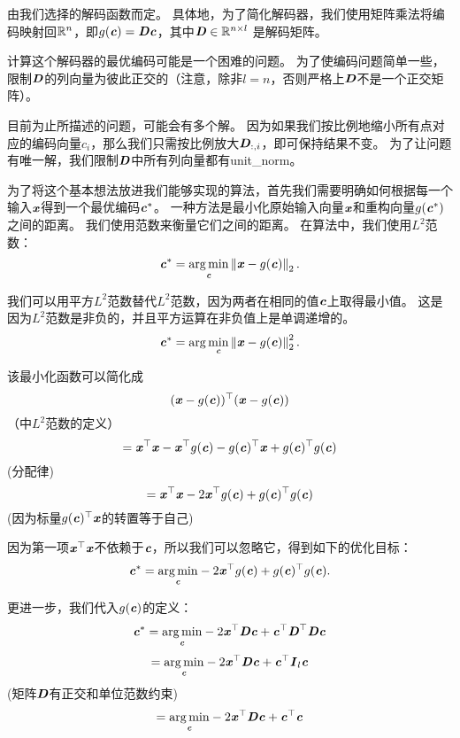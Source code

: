由我们选择的解码函数而定。
具体地，为了简化解码器，我们使用矩阵乘法将编码映射回$\SetR^n$，即$g(\Vc)=\MD\Vc$，其中$\MD\in \SetR^{n\times l}$ 是解码矩阵。



计算这个解码器的最优编码可能是一个困难的问题。
为了使编码问题简单一些，限制$\MD$的列向量为彼此正交的（注意，除非$l=n$，否则严格上$\MD$不是一个正交矩阵）。


目前为止所描述的问题，可能会有多个解。
因为如果我们按比例地缩小所有点对应的编码向量$c_i$，那么我们只需按比例放大$\MD_{:,i}$，即可保持结果不变。
为了让问题有唯一解，我们限制$\MD$中所有列向量都有\gls{unit_norm}。


为了将这个基本想法放进我们能够实现的算法，首先我们需要明确如何根据每一个输入$\Vx$得到一个最优编码$\Vc^*$。
一种方法是最小化原始输入向量$\Vx$和重构向量$g(\Vc^*)$之间的距离。
我们使用范数来衡量它们之间的距离。
在算法中，我们使用$L^2$范数：
\begin{equation}
\label{eq:2.52}
\Vc^* = \underset{\Vc}{\arg\min} \norm{\Vx-g(\Vc)}_2.
\end{equation}


我们可以用平方$L^2$范数替代$L^2$范数，因为两者在相同的值$\Vc$上取得最小值。
这是因为$L^2$范数是非负的，并且平方运算在非负值上是单调递增的。
\begin{equation}
\Vc^* = \argmin_{\Vc} \norm{\Vx - g(\Vc)}_2^2.
\end{equation}


该最小化函数可以简化成
\begin{equation}
(\Vx-g(\Vc))^\top(\Vx-g(\Vc))
\end{equation}
（中$L^2$范数的定义）
\begin{equation}
    = \Vx^\top\Vx - \Vx^\top g(\Vc) - g(\Vc)^\top\Vx + g(\Vc)^\top g(\Vc)
\end{equation}
(分配律)
\begin{equation}
    = \Vx^\top \Vx - 2\Vx^\top g(\Vc) + g(\Vc)^\top g(\Vc)
\end{equation}
(因为标量$g(\Vc)^\top\Vx$的转置等于自己)


因为第一项$\Vx^\top\Vx$不依赖于$\Vc$，所以我们可以忽略它，得到如下的优化目标：
\begin{equation}
\Vc^* = \underset{\Vc}{\arg\min} - 2\Vx^\top g(\Vc) + g(\Vc)^\top g(\Vc).
\end{equation}


更进一步，我们代入$g(\Vc)$的定义：
\begin{equation}
    \Vc^* = \underset{\Vc}{\arg\min} - 2\Vx^\top\MD\Vc + \Vc^\top\MD^\top\MD\Vc
\end{equation}
\begin{equation}
    = \underset{\Vc}{\arg\min} -2\Vx^\top\MD\Vc + \Vc^\top\MI_l\Vc
\end{equation}
(矩阵$\MD$有正交和单位范数约束)
\begin{equation}
    = \underset{\Vc}{\arg\min} -2\Vx^\top\MD\Vc + \Vc^\top\Vc
\end{equation}



